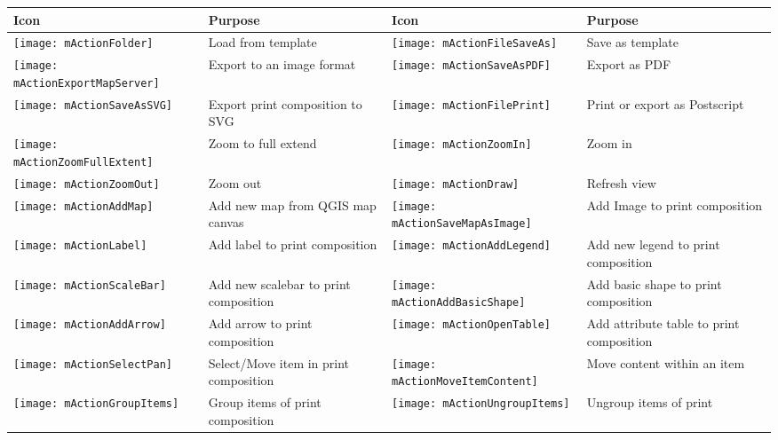 \begin{table}[h]
\centering\small
\renewcommand{\arraystretch}{2}
 \begin{tabular}{|m{1cm}|m{5.4cm}|m{1cm}|m{5.4cm}|}
 \hline \textbf{Icon} & \textbf{Purpose} & \textbf{Icon} &
 \textbf{Purpose} \\
 \hline \texttt{[image: mActionFolder]}
 & Load from template &
 \texttt{[image: mActionFileSaveAs]} & Save as template \\
 \hline \texttt{[image: mActionExportMapServer]}
 & Export to an image format &
 \texttt{[image: mActionSaveAsPDF]} & Export as PDF \\
 \hline \texttt{[image: mActionSaveAsSVG]} & Export print
 composition to SVG & \texttt{[image: mActionFilePrint]}
 & Print or export as Postscript \\
 \hline \texttt{[image: mActionZoomFullExtent]} & Zoom to
 full extend & \texttt{[image: mActionZoomIn]} & Zoom in \\
 \hline \texttt{[image: mActionZoomOut]} & Zoom out &
 \texttt{[image: mActionDraw]} & Refresh view \\
 \hline \texttt{[image: mActionAddMap]} & Add new map from
 QGIS map canvas & \texttt{[image: mActionSaveMapAsImage]}
 & Add Image to print composition \\
 \hline \texttt{[image: mActionLabel]} & Add label to print
 composition & \texttt{[image: mActionAddLegend]} & Add new
 legend to print composition \\
 \hline \texttt{[image: mActionScaleBar]} & Add new scalebar
 to print composition & \texttt{[image: mActionAddBasicShape]}
 & Add basic shape to print composition \\
 \hline \texttt{[image: mActionAddArrow]} & Add arrow to print
 composition & \texttt{[image: mActionOpenTable]} & Add attribute
 table to print composition \\
 \hline \texttt{[image: mActionSelectPan]} & Select/Move item in
 print composition &
 \texttt{[image: mActionMoveItemContent]} & Move content within
 an item \\
 \hline \texttt{[image: mActionGroupItems]} & Group items of
 print composition &
 \texttt{[image: mActionUngroupItems]} & Ungroup items of print

\end{tabular}
\end{table}
